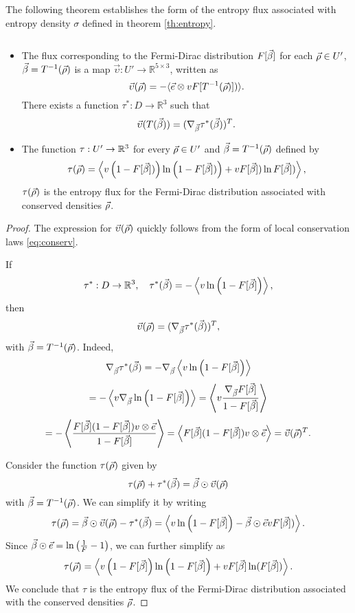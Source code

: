 The following theorem establishes the form of the entropy flux associated with entropy density $\sigma$ defined in theorem \ref{th:entropy}.
\begin{theorem}\label{th:entropyFlux}
\[\quad\]
\begin{itemize}
	\item The flux corresponding to the Fermi-Dirac distribution $F[{\vec\beta}]$   for each ${\vec\rho}\in U'$, ${\vec\beta}=T^{-1}({\vec\rho}) $  is a map $\vec \upsilon: U'\to\mathbb R^{5\times 3}$, written as 
\[\vec \upsilon({\vec\rho})=-\langle \vec e\otimes v
F[T^{-1}({\vec\rho})])\rangle.\]
There exists a function $\tau^\ast: D\to\mathbb R^3$ such that 
 \begin{equation*}
 	\vec \upsilon(T({\vec\beta}))=(\nabla_{{\vec\beta}}\tau^{\ast}({\vec\beta}))^{T}.
 \end{equation*}

 \item 
The function $\tau:U'\to{\mathbb {R}^3}$ for every ${\vec\rho}\in U'$ 
and ${\vec\beta}  = T^{-1}({\vec\rho})$ defined by 
\[\tau ({\vec\rho})= \left\langle
v\left(1-F[{\vec\beta}])\right)\ln\left(1-F[{\vec\beta}])\right) +vF[{\vec\beta}])\ln
F[{\vec\beta}])\right\rangle,\]
$\tau({\vec\rho})$ is  the entropy flux for the  Fermi-Dirac distribution 
associated with conserved densities ${\vec\rho}$.
\end{itemize}
\end{theorem}
\begin{proof}
The expression for $\vec \upsilon({\vec\rho})$ quickly follows from the form of local conservation laws \eqref{eq:conserv}.

If \[\tau^\ast: D\to{\mathbb {R}^3},\quad\tau^\ast({\vec\beta})=-\left\langle
v\ln\left(1-F [\vec
\beta] \right)\right\rangle,\]
then 
\[\vec \upsilon({\vec\rho})=(\nabla_{{\vec\beta}}\tau^{\ast}({\vec\beta}))^{T},\]
with ${\vec\beta} = T^{-1}({\vec\rho}) $.
Indeed, 
\[\nabla_{{\vec\beta}}\tau^{\ast}({\vec\beta}) = -\nabla_{{\vec\beta}}\left\langle
v\ln\left(1-F [\vec
\beta] \right)\right\rangle\]
\[=-\left\langle
v\nabla_{{\vec\beta}}\ln\left(1-F [{\vec\beta}]\right)\right\rangle = \left\langle
v  \frac{\nabla_{{\vec\beta}}F [{\vec\beta}]}{1-F [{\vec\beta}]} \right\rangle \]
\[= -\left\langle
  \frac{ F [{\vec\beta}](1-F [{\vec\beta}])v\otimes\vec e}{1-F [{\vec\beta}]} \right\rangle = \left\langle
    F [{\vec\beta}](1-F [{\vec\beta}])v\otimes\vec e  \right\rangle = \vec \upsilon({\vec\rho})^T .\]

 Consider the function $\tau({\vec\rho})$  given by
 \[\tau({\vec\rho})+\tau^\ast({\vec\beta})={\vec\beta}\odot\vec\upsilon({\vec\rho})\]
 with ${\vec\beta}=T^{-1}({\vec\rho})$. We can simplify it by writing
\[\tau({\vec\rho}) = {\vec\beta}\odot\vec\upsilon({\vec\rho}) - \tau^\ast({\vec\beta}) =\left\langle v\ln\left(1-F [\vec
\beta] \right)-{\vec\beta}\odot\vec e  v
F[  {\vec\beta} ]) \right\rangle.\]
Since ${\vec\beta}\odot\vec e = \ln \left(\frac 1F-1\right)$, we can further simplify as 
\[\tau({\vec\rho}) =  \left\langle v\left(1-F [\vec
\beta] \right)\ln\left(1-F [\vec
\beta] \right)+  vF [\vec
\beta]\ln(F [\vec
\beta])
  \right\rangle.\]
  We conclude that $\tau$ is the entropy flux of the Fermi-Dirac distribution associated with the conserved densities ${\vec\rho}$.
\end{proof}

